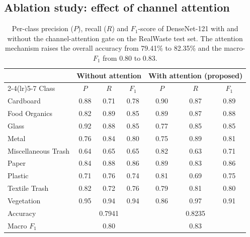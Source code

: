 \documentclass[a4paper,fleqn]{cas-dc}
\begin{document}
\subsection{Ablation study: effect of channel attention}\label{sec:ablation}

\begin{table}[t]
\small
\rmfamily
\caption{Per-class precision ($P$), recall ($R$) and $F_1$-score of
DenseNet-121 with and without the channel-attention gate on the RealWaste
test set. The attention mechanism raises the overall accuracy from
79.41\% to 82.35\% and the macro-$F_1$ from 0.80 to 0.83.}
\label{tbl:ablation}
\begin{tabular*}{\tblwidth}{@{\extracolsep{\fill}} l ccc ccc @{}}
\toprule
 & \multicolumn{3}{c}{Without attention} & \multicolumn{3}{c}{With attention (proposed)}\\
\cmidrule(lr){2-4}\cmidrule(lr){5-7}
Class & $P$ & $R$ & $F_1$ & $P$ & $R$ & $F_1$\\
\midrule
Cardboard           & 0.88 & 0.71 & 0.78 & 0.90 & 0.87 & 0.89\\
Food Organics       & 0.82 & 0.89 & 0.85 & 0.89 & 0.87 & 0.88\\
Glass               & 0.92 & 0.88 & 0.85 & 0.77 & 0.85 & 0.85\\
Metal               & 0.76 & 0.84 & 0.80 & 0.75 & 0.89 & 0.81\\
Miscellaneous Trash & 0.64 & 0.65 & 0.65 & 0.82 & 0.63 & 0.71\\
Paper               & 0.84 & 0.88 & 0.86 & 0.89 & 0.83 & 0.86\\
Plastic             & 0.71 & 0.76 & 0.74 & 0.81 & 0.69 & 0.75\\
Textile Trash       & 0.82 & 0.72 & 0.76 & 0.79 & 0.81 & 0.80\\
Vegetation          & 0.95 & 0.94 & 0.94 & 0.86 & 0.97 & 0.91\\
\midrule
Accuracy            & \multicolumn{3}{c}{0.7941} & \multicolumn{3}{c}{0.8235}\\
Macro $F_1$         & \multicolumn{3}{c}{0.80} & \multicolumn{3}{c}{0.83}\\
\bottomrule
\end{tabular*}
\end{table}
\end{document}
